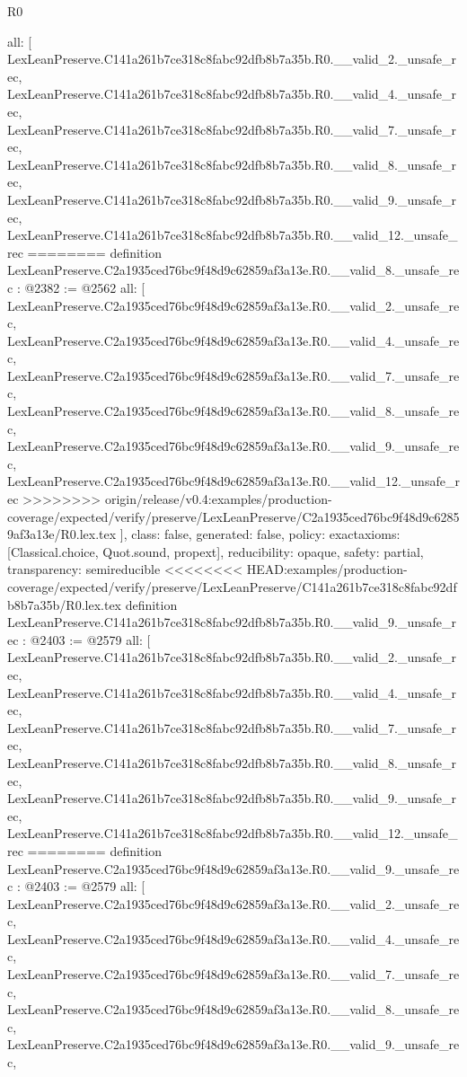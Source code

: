 \begin{lexlean}{R0}
\begin{coremodule}
{{{{{{{{{{{{{{{{{{{{{{{{{{{{{{{{{{{{{{{{{{{{{{{{{{{{{  all: [
    LexLeanPreserve.C141a261b7ce318c8fabc92dfb8b7a35b.R0.__valid_2._unsafe_rec,
    LexLeanPreserve.C141a261b7ce318c8fabc92dfb8b7a35b.R0.__valid_4._unsafe_rec,
    LexLeanPreserve.C141a261b7ce318c8fabc92dfb8b7a35b.R0.__valid_7._unsafe_rec,
    LexLeanPreserve.C141a261b7ce318c8fabc92dfb8b7a35b.R0.__valid_8._unsafe_rec,
    LexLeanPreserve.C141a261b7ce318c8fabc92dfb8b7a35b.R0.__valid_9._unsafe_rec,
    LexLeanPreserve.C141a261b7ce318c8fabc92dfb8b7a35b.R0.__valid_12._unsafe_rec
========
definition LexLeanPreserve.C2a1935ced76bc9f48d9c62859af3a13e.R0.__valid_8._unsafe_rec : @2382 := @2562 {
  all: [
    LexLeanPreserve.C2a1935ced76bc9f48d9c62859af3a13e.R0.__valid_2._unsafe_rec,
    LexLeanPreserve.C2a1935ced76bc9f48d9c62859af3a13e.R0.__valid_4._unsafe_rec,
    LexLeanPreserve.C2a1935ced76bc9f48d9c62859af3a13e.R0.__valid_7._unsafe_rec,
    LexLeanPreserve.C2a1935ced76bc9f48d9c62859af3a13e.R0.__valid_8._unsafe_rec,
    LexLeanPreserve.C2a1935ced76bc9f48d9c62859af3a13e.R0.__valid_9._unsafe_rec,
    LexLeanPreserve.C2a1935ced76bc9f48d9c62859af3a13e.R0.__valid_12._unsafe_rec
>>>>>>>> origin/release/v0.4:examples/production-coverage/expected/verify/preserve/LexLeanPreserve/C2a1935ced76bc9f48d9c62859af3a13e/R0.lex.tex
  ],
  class: false,
  generated: false,
  policy: exact{axioms: [Classical.choice, Quot.sound, propext]},
  reducibility: opaque{},
  safety: partial,
  transparency: semireducible
}
<<<<<<<< HEAD:examples/production-coverage/expected/verify/preserve/LexLeanPreserve/C141a261b7ce318c8fabc92dfb8b7a35b/R0.lex.tex
definition LexLeanPreserve.C141a261b7ce318c8fabc92dfb8b7a35b.R0.__valid_9._unsafe_rec : @2403 := @2579 {
  all: [
    LexLeanPreserve.C141a261b7ce318c8fabc92dfb8b7a35b.R0.__valid_2._unsafe_rec,
    LexLeanPreserve.C141a261b7ce318c8fabc92dfb8b7a35b.R0.__valid_4._unsafe_rec,
    LexLeanPreserve.C141a261b7ce318c8fabc92dfb8b7a35b.R0.__valid_7._unsafe_rec,
    LexLeanPreserve.C141a261b7ce318c8fabc92dfb8b7a35b.R0.__valid_8._unsafe_rec,
    LexLeanPreserve.C141a261b7ce318c8fabc92dfb8b7a35b.R0.__valid_9._unsafe_rec,
    LexLeanPreserve.C141a261b7ce318c8fabc92dfb8b7a35b.R0.__valid_12._unsafe_rec
========
definition LexLeanPreserve.C2a1935ced76bc9f48d9c62859af3a13e.R0.__valid_9._unsafe_rec : @2403 := @2579 {
  all: [
    LexLeanPreserve.C2a1935ced76bc9f48d9c62859af3a13e.R0.__valid_2._unsafe_rec,
    LexLeanPreserve.C2a1935ced76bc9f48d9c62859af3a13e.R0.__valid_4._unsafe_rec,
    LexLeanPreserve.C2a1935ced76bc9f48d9c62859af3a13e.R0.__valid_7._unsafe_rec,
    LexLeanPreserve.C2a1935ced76bc9f48d9c62859af3a13e.R0.__valid_8._unsafe_rec,
    LexLeanPreserve.C2a1935ced76bc9f48d9c62859af3a13e.R0.__valid_9._unsafe_rec,
}}}}}}}}}}}}}}}}}}}}}}}}}}}}}}}}}}}}}}}}}}}}}}}}}}}}}}}
\end{coremodule}
\end{lexlean}
